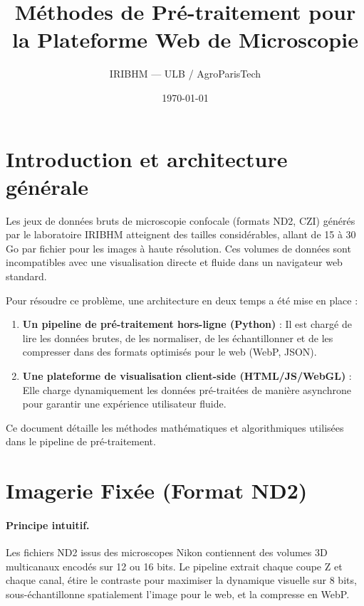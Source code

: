 \documentclass[11pt,a4paper]{article}
\begin{document}
\title{Méthodes de Pré-traitement pour la Plateforme Web de Microscopie}
\author{IRIBHM — ULB / AgroParisTech}
\date{\today}
\maketitle

\tableofcontents

\section{Introduction et architecture générale}

Les jeux de données bruts de microscopie confocale (formats ND2, CZI) générés par le laboratoire IRIBHM atteignent des tailles considérables, allant de 15 à 30 Go par fichier pour les images à haute résolution. Ces volumes de données sont incompatibles avec une visualisation directe et fluide dans un navigateur web standard. 

Pour résoudre ce problème, une architecture en deux temps a été mise en place :
\begin{enumerate}
    \item \textbf{Un pipeline de pré-traitement hors-ligne (Python)} : Il est chargé de lire les données brutes, de les normaliser, de les échantillonner et de les compresser dans des formats optimisés pour le web (WebP, JSON).
    \item \textbf{Une plateforme de visualisation client-side (HTML/JS/WebGL)} : Elle charge dynamiquement les données pré-traitées de manière asynchrone pour garantir une expérience utilisateur fluide.
\end{enumerate}

Ce document détaille les méthodes mathématiques et algorithmiques utilisées dans le pipeline de pré-traitement.

\section{Imagerie Fixée (Format ND2)}

\paragraph{Principe intuitif.}
Les fichiers ND2 issus des microscopes Nikon contiennent des volumes 3D multicanaux encodés sur 12 ou 16 bits. Le pipeline extrait chaque coupe Z et chaque canal, étire le contraste pour maximiser la dynamique visuelle sur 8 bits, sous-échantillonne spatialement l'image pour le web, et la compresse en WebP.
\end{document}
